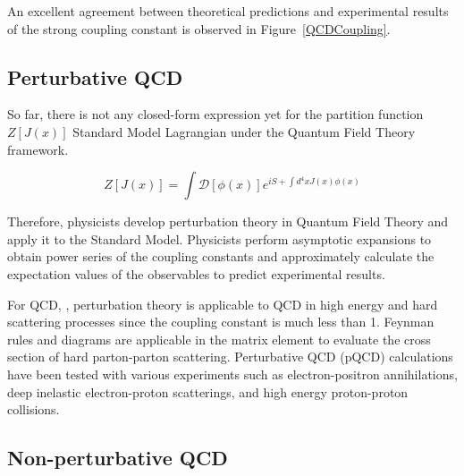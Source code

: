 An excellent agreement between theoretical predictions and experimental results of the strong coupling constant is observed in Figure~\ref{QCDCoupling}. 

\subsection{Perturbative QCD}


So far, there is not any closed-form expression yet for the partition function $Z[J(x)]$ Standard Model Lagrangian under the Quantum Field Theory framework.

\begin{equation}
Z[J(x)] = \int \mathcal{D}[\phi(x)] e^{iS + \int d^4 x J(x) \phi(x)}
\end{equation}

Therefore, physicists develop perturbation theory in Quantum Field Theory and apply it to the Standard Model. Physicists perform asymptotic expansions to obtain power series of the coupling constants and approximately calculate the expectation values of the observables to predict experimental results.

For QCD, ,  perturbation theory is applicable to QCD in high energy and hard scattering processes since the coupling constant is much less than 1. Feynman rules and diagrams are applicable in the matrix element to evaluate the cross section of hard parton-parton scattering. Perturbative QCD (pQCD) calculations have been tested with various experiments such as electron-positron annihilations, deep inelastic electron-proton scatterings, and high energy proton-proton collisions.

\subsection{Non-perturbative QCD}

